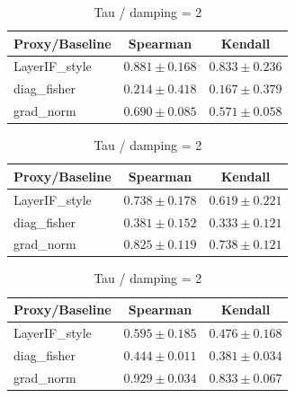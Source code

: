 \documentclass[accepted]{uai2026}%
\theoremstyle{remark}%
\begin{document}
\begin{table}[htbp]
    \begin{minipage}{0.48\textwidth}
        \centering
        \caption{Tau / damping = 0.1}
        \label{tab:tau_0.1}
        \begin{tabular}{lcc}
        \toprule
        Proxy/Baseline & Spearman & Kendall \\
        \midrule
        LayerIF\_style & $0.881 \pm 0.168$ & $0.833 \pm 0.236$ \\
        diag\_fisher & $0.214 \pm 0.418$ & $0.167 \pm 0.379$ \\
        grad\_norm & $0.690 \pm 0.085$ & $0.571 \pm 0.058$ \\
        \bottomrule
        \end{tabular}
    \end{minipage}\hfill
    \begin{minipage}{0.48\textwidth}
        \centering
        \caption{Tau / damping = 1}
        \label{tab:tau_1}
        \begin{tabular}{lcc}
        \toprule
        Proxy/Baseline & Spearman & Kendall \\
        \midrule
        LayerIF\_style & $0.738 \pm 0.178$ & $0.619 \pm 0.221$ \\
        diag\_fisher & $0.381 \pm 0.152$ & $0.333 \pm 0.121$ \\
        grad\_norm & $0.825 \pm 0.119$ & $0.738 \pm 0.121$ \\
        \bottomrule
        \end{tabular}
    \end{minipage}
    
    \vspace{1.5em}%
    
    \begin{minipage}{0.48\textwidth}
        \centering
        \caption{Tau / damping = 2}
        \label{tab:tau_2}
        \begin{tabular}{lcc}
        \toprule
        Proxy/Baseline & Spearman & Kendall \\
        \midrule
        LayerIF\_style & $0.595 \pm 0.185$ & $0.476 \pm 0.168$ \\
        diag\_fisher & $0.444 \pm 0.011$ & $0.381 \pm 0.034$ \\
        grad\_norm & $0.929 \pm 0.034$ & $0.833 \pm 0.067$ \\
        \bottomrule
        \end{tabular}
    \end{minipage}
    
\end{table}
\end{document}
